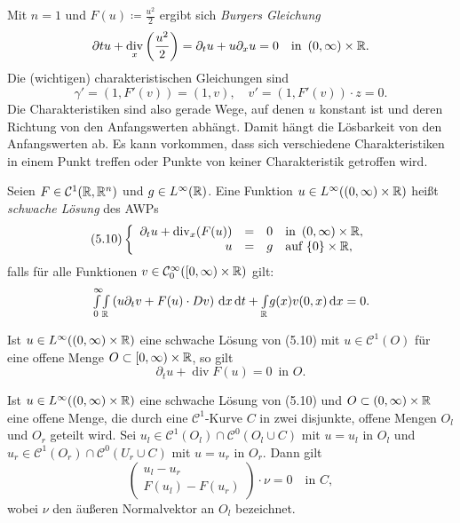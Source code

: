 \documentclass{cheat-sheet}
\DeclareMathOperator{\dive}{div} %
\begin{document}
\begin{bsp}
  Mit $n=1$ und $F(u) \coloneqq \tfrac{u^2}{2}$ ergibt sich \emph{Burgers Gleichung}
  \[
    \partial t u + \dive_x \left( \frac{u^2}{2} \right) = \partial_t u + u \partial_x u = 0
    \quad \text{in } \ointerval{0}{\infty} \times \R.
  \]
  Die (wichtigen) charakteristischen Gleichungen sind
  \[
    \gamma' = (1, F'(v)) = (1, v), \quad
    v' = (1, F'(v)) \cdot z = 0.
  \]
  Die Charakteristiken sind also gerade Wege, auf denen $u$ konstant ist und deren Richtung von den Anfangswerten abhängt. Damit hängt die Lösbarkeit von den Anfangswerten ab. Es kann vorkommen, dass sich verschiedene Charakteristiken in einem Punkt treffen oder Punkte von keiner Charakteristik getroffen wird.
\end{bsp}

\begin{defn}
  Seien $F \in \mathcal{C}^1(\mathbb{R}, \mathbb{R}^n)$ und $g \in L^\infty(\mathbb{R})$. Eine Funktion $u \in L^\infty(\left( 0, \infty \right) \times \mathbb{R})$ heißt \emph{schwache Lösung} des AWPs
  \[
    (5.10) \left\{ \begin{array}{rlll}
      \partial_t u + \dive_x(F(u)) & = & 0 & \text{in } \ointerval{0}{\infty} \times \R, \\
      u & = & g & \text{auf } \{ 0 \} \times \R,
    \end{array} \right.
  \]
  falls für alle Funktionen $v \in \mathcal{C}_0^\infty(\left[ 0, \infty \right) \times \mathbb{R})$ gilt:
  \[
    {\textstyle \int\limits_{0}^{\infty}} {\textstyle \int\limits_{\mathbb{R}}^{}} \left( u \partial_t v + F(u) \cdot D v \right) \,\mathrm{d} x \,\mathrm{d} t + {\textstyle \int\limits_{\mathbb{R}}^{}} g(x) v(0, x) \,\mathrm{d} x = 0.
  \]
\end{defn}

\begin{lem}
  Ist $u \in L^\infty(\left( 0, \infty \right) \times \mathbb{R})$ eine schwache Lösung von (5.10) mit $u \in \mathcal{C}^1(O)$ für eine offene Menge $O \subset \left[ 0, \infty \right) \times \mathbb{R}$, so gilt
  \[ \partial_t u + \dive F(u) = 0 \enspace \text{in } O. \]
\end{lem}

\begin{lem}
  Ist $u \in L^\infty(\left( 0, \infty \right) \times \mathbb{R})$ eine schwache Lösung von (5.10) und $O \subset \left( 0, \infty \right) \times \mathbb{R}$ eine offene Menge, die durch eine $\mathcal{C}^1$-Kurve $C$ in zwei disjunkte, offene Mengen $O_l$ und $O_r$ geteilt wird. Sei $u_l \in \mathcal{C}^1(O_l) \cap \mathcal{C}^0(O_l \cup C)$ mit $u = u_l$ in $O_l$ und $u_r \in \mathcal{C}^1(O_r) \cap \mathcal{C}^0(U_r \cup C)$ mit $u = u_r$ in $O_r$. Dann gilt
  \[
    \begin{pmatrix}
      u_l - u_r \\
      F(u_l) - F(u_r)
    \end{pmatrix} \cdot \nu = 0
    \quad \text{in } C,
  \]
  wobei $\nu$ den äußeren Normalvektor an $O_l$ bezeichnet.
\end{lem}
\end{document}
